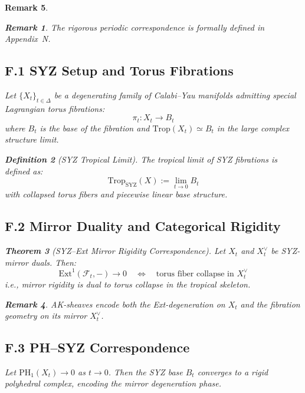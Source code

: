 \documentclass[11pt]{article}
\newtheorem{theorem}{Theorem}[section]
\newtheorem{definition}[theorem]{Definition}
\newtheorem{remark}[theorem]{Remark}
\begin{document}
\begin{remark}
\begin{remark}
The rigorous periodic correspondence is formally defined in Appendix~N.
\end{remark}

\subsection*{F.1 SYZ Setup and Torus Fibrations}

Let \( \{X_t\}_{t \in \Delta} \) be a degenerating family of Calabi–Yau manifolds admitting special Lagrangian torus fibrations:
\[
\pi_t : X_t \to B_t
\]
where \( B_t \) is the base of the fibration and \( \mathrm{Trop}(X_t) \simeq B_t \) in the large complex structure limit.

\begin{definition}[SYZ Tropical Limit]
The tropical limit of SYZ fibrations is defined as:
\[
\mathrm{Trop}_{\mathrm{SYZ}}(X) := \lim_{t \to 0} B_t
\]
with collapsed torus fibers and piecewise linear base structure.
\end{definition}

\subsection*{F.2 Mirror Duality and Categorical Rigidity}

\begin{theorem}[SYZ–Ext Mirror Rigidity Correspondence]
Let \( X_t \) and \( X_t^\vee \) be SYZ-mirror duals. Then:
\[
\mathrm{Ext}^1(\mathcal{F}_t, -) \to 0 \quad \Leftrightarrow \quad \text{torus fiber collapse in } X_t^\vee
\]
i.e., mirror rigidity is dual to torus collapse in the tropical skeleton.
\end{theorem}

\begin{remark}
AK-sheaves encode both the Ext-degeneration on \( X_t \) and the fibration geometry on its mirror \( X_t^\vee \).
\end{remark}

\subsection*{F.3 PH–SYZ Correspondence}

\begin{proposition}
Let \( \mathrm{PH}_1(X_t) \to 0 \) as \( t \to 0 \). Then the SYZ base \( B_t \) converges to a rigid polyhedral complex, encoding the mirror degeneration phase.
\end{proposition}


\end{remark}
\end{document}
